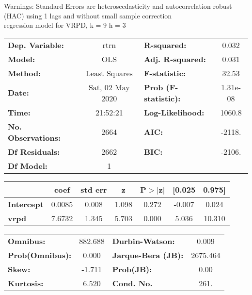 Warnings: \newline
 [1] Standard Errors are heteroscedasticity and autocorrelation robust (HAC) using 1 lags and without small sample correction\\ 

regression model for VRPD, k = 9 h = 3\begin{center}
\begin{tabular}{lclc}
\toprule
\textbf{Dep. Variable:}    &       rtrn       & \textbf{  R-squared:         } &     0.032   \\
\textbf{Model:}            &       OLS        & \textbf{  Adj. R-squared:    } &     0.031   \\
\textbf{Method:}           &  Least Squares   & \textbf{  F-statistic:       } &     32.53   \\
\textbf{Date:}             & Sat, 02 May 2020 & \textbf{  Prob (F-statistic):} &  1.31e-08   \\
\textbf{Time:}             &     21:52:21     & \textbf{  Log-Likelihood:    } &    1060.8   \\
\textbf{No. Observations:} &        2664      & \textbf{  AIC:               } &    -2118.   \\
\textbf{Df Residuals:}     &        2662      & \textbf{  BIC:               } &    -2106.   \\
\textbf{Df Model:}         &           1      & \textbf{                     } &             \\
\bottomrule
\end{tabular}
\begin{tabular}{lcccccc}
                   & \textbf{coef} & \textbf{std err} & \textbf{z} & \textbf{P$> |$z$|$} & \textbf{[0.025} & \textbf{0.975]}  \\
\midrule
\textbf{Intercept} &       0.0085  &        0.008     &     1.098  &         0.272        &       -0.007    &        0.024     \\
\textbf{vrpd}      &       7.6732  &        1.345     &     5.703  &         0.000        &        5.036    &       10.310     \\
\bottomrule
\end{tabular}
\begin{tabular}{lclc}
\textbf{Omnibus:}       & 882.688 & \textbf{  Durbin-Watson:     } &    0.009  \\
\textbf{Prob(Omnibus):} &   0.000 & \textbf{  Jarque-Bera (JB):  } & 2675.464  \\
\textbf{Skew:}          &  -1.711 & \textbf{  Prob(JB):          } &     0.00  \\
\textbf{Kurtosis:}      &   6.520 & \textbf{  Cond. No.          } &     261.  \\
\bottomrule
\end{tabular}
\end{center}

